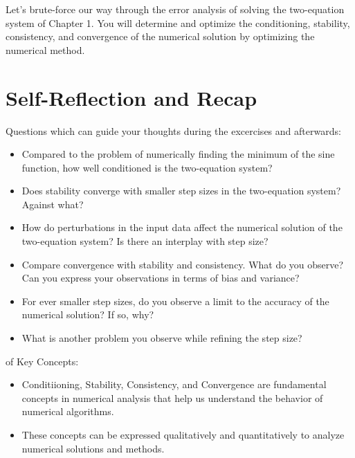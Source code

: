 Let's brute-force our way through the error analysis of solving the two-equation system of Chapter 1.
You will determine and optimize the conditioning, stability, consistency, and convergence of the numerical solution by optimizing the numerical method.





\section{Self-Reflection and Recap}

 Questions which can guide your thoughts during the excercises and afterwards:
\begin{itemize}
    \item Compared to the problem of numerically finding the minimum of the sine function, how well conditioned is the two-equation system?
    \item Does stability converge with smaller step sizes in the two-equation system? Against what? 
    \item How do perturbations in the input data affect the numerical solution of the two-equation system? Is there an interplay with step size?
    \item Compare convergence with stability and consistency. What do you observe? Can you express your observations in terms of bias and variance?
    \item For ever smaller step sizes, do you observe a limit to the accuracy of the numerical solution? If so, why?
    \item What is another problem you observe while refining the step size? 
\end{itemize}

 of Key Concepts:
\begin{itemize}
    \item Conditiioning, Stability, Consistency, and Convergence are fundamental concepts in numerical analysis that help us understand the behavior of numerical algorithms.
    \item These concepts can be expressed qualitatively and quantitatively to analyze numerical solutions and methods.
\end{itemize}



